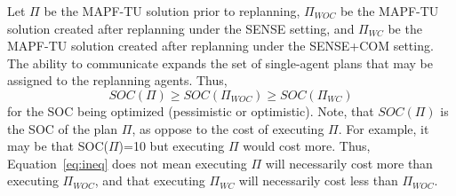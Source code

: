 \documentclass[jair,twoside,11pt,theapa]{article}
\newcommand{\mapftu}{MAPF-TU\xspace}
\newcommand{\sense}{SENSE\xspace}
\newcommand{\sensecom}{SENSE+COM\xspace}
\begin{document}
Let $\Pi$ be the \mapftu solution prior to replanning, 
$\Pi_{WOC}$ be the \mapftu solution created after replanning under the \sense setting, 
and $\Pi_{WC}$ be the \mapftu solution created after replanning under the \sensecom setting. 
The ability to communicate expands the set of single-agent plans that may be assigned to the replanning agents. 
Thus, 
\begin{equation}
    SOC(\Pi)\geq SOC(\Pi_{WOC})\geq SOC(\Pi_{WC})
    \label{eq:ineq}
\end{equation} 
for the SOC being optimized (pessimistic or optimistic). 
Note, that $SOC(\Pi)$ is the SOC of the plan $\Pi$, as oppose to the cost of executing $\Pi$. 
For example, it may be that SOC($\Pi$)=10 but executing $\Pi$ would cost more. 
Thus, Equation~\ref{eq:ineq} does not mean executing $\Pi$ will necessarily cost more than executing $\Pi_{WOC}$, and 
that executing $\Pi_{WC}$ will necessarily cost less than $\Pi_{WOC}$. 


\end{document}
